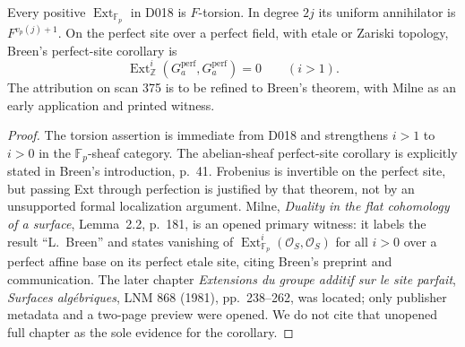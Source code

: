 \begin{proposition}\label{sa08:D019}
Every positive $\operatorname{Ext}_{\mathbb F_p}$ in D018 is
$F$-torsion. In degree $2j$ its uniform annihilator is
$F^{v_p(j)+1}$. On the perfect site over a perfect field, with
etale or Zariski topology, Breen's perfect-site corollary is
\[
 \operatorname{Ext}_{\mathbb Z}^i(G_a^{\mathrm{perf}},
              G_a^{\mathrm{perf}})=0\qquad(i>1).
\]
The attribution on scan 375 is to be refined to Breen's theorem,
with Milne as an early application and printed witness.
\end{proposition}
\begin{proof}
The torsion assertion is immediate from D018 and strengthens
$i>1$ to $i>0$ in the $\mathbb F_p$-sheaf category. The
abelian-sheaf perfect-site corollary is explicitly stated in
Breen's introduction, p.~41. Frobenius is invertible on the
perfect site, but passing Ext through perfection is justified by
that theorem, not by an unsupported formal localization argument.
Milne, \emph{Duality in the flat cohomology of a surface},
Lemma~2.2, p.~181, is an opened primary witness: it labels the
result ``L.~Breen'' and states vanishing of
$\operatorname{Ext}_{\mathbb F_p}^i(\mathcal O_S,\mathcal O_S)$
for all $i>0$ over a perfect affine base on its perfect etale
site, citing Breen's preprint and communication.
The later chapter \emph{Extensions du groupe additif sur le site
parfait}, \emph{Surfaces alg\'ebriques}, LNM 868 (1981),
pp.~238--262, was located; only publisher metadata and a two-page
preview were opened. We do not cite that unopened full chapter
as the sole evidence for the corollary.
\end{proof}

